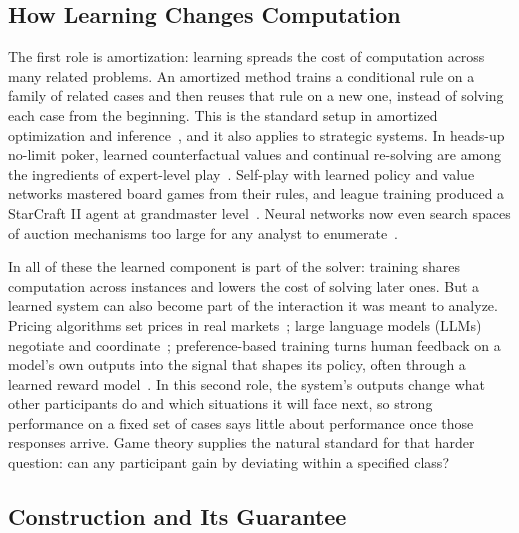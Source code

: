 \subsection{How Learning Changes Computation}
\label{sec:intro:change}

The first role is amortization: learning spreads the cost of computation across
many related problems. An amortized method trains a conditional rule on a family
of related cases and then reuses that rule on a new one, instead of solving each case from the beginning. This is the standard setup in amortized optimization and
inference~\citep{Amos2022Amortized,KingmaWelling2014}, and it also applies to
strategic systems. In heads-up no-limit poker, learned counterfactual values and continual
re-solving are among the ingredients of expert-level
play~\citep{Moravcik2017,BrownSandholm2018,BrownReBeL2020}. Self-play with
learned policy and value networks mastered board games from their rules, and
league training produced a StarCraft II agent at grandmaster
level~\citep{Silver2018,Vinyals2019}. Neural networks now even search spaces of
auction mechanisms too large for any analyst to
enumerate~\citep{Duetting2019,Duan2023,Duetting2024}.

In all of these the learned component is part of the solver: training shares
computation across instances and lowers the cost of solving later ones. But a
learned system can also become part of the interaction it was meant to analyze.
Pricing algorithms set prices in real
markets~\citep{Calvano2020,Assad2024}; large language models (LLMs) negotiate and
coordinate~\citep{Bianchi2024NegotiationArena,Akata2025}; preference-based
training turns human feedback on a model's own outputs into the signal that
shapes its policy, often through a learned reward
model~\citep{Christiano2017,Ouyang2022}. In this second role, the system's outputs change what
other participants do and which situations it will face next, so strong
performance on a fixed set of cases says little about performance once those
responses arrive. Game theory supplies the natural standard for that harder
question: can any participant gain by deviating within a specified class?

\subsection{Construction and Its Guarantee}
\label{sec:intro:cost}

